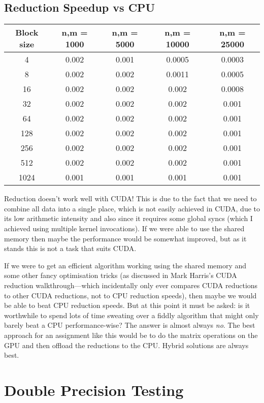 \documentclass[a4paper, fleqn]{article}
\begin{document}
\subsection{Reduction Speedup vs CPU}%
\begin{center}
 \begin{tabular}{||c | c | c | c | c ||}
 \hline
 Block size & n,m = 1000 & n,m = 5000 & n,m = 10000 & n,m = 25000 \\ [0.5ex] 
 \hline
 4 & 0.002 & 0.001 & 0.0005 & 0.0003 \\
 \hline
 8 & 0.002 & 0.002 & 0.0011 & 0.0005 \\
 \hline
 16 & 0.002 & 0.002 & 0.002 & 0.0008 \\
 \hline
 32 & 0.002 & 0.002 & 0.002 & 0.001 \\
 \hline
 64 & 0.002 & 0.002 & 0.002 & 0.001 \\
 \hline
 128 & 0.002 & 0.002 & 0.002 & 0.001 \\
 \hline
 256 & 0.002 & 0.002 & 0.002 & 0.001 \\
 \hline
 512 & 0.002 & 0.002 & 0.002 & 0.001 \\
 \hline
 1024 & 0.001 & 0.001 & 0.001 & 0.001 \\
 \hline
\end{tabular}
\end{center}
Reduction doesn't work well with CUDA! This is due to the fact that we need to combine all data into a single place, which is not easily achieved in CUDA, due to its low arithmetic intensity and also since it requires some global syncs (which I achieved using multiple kernel invocations). If we were able to use the shared memory then maybe the performance would be somewhat improved, but as it stands this is not a task that suits CUDA. 

If we were to get an efficient algorithm working using the shared memory and some other fancy optimisation tricks (as discussed in Mark Harris's CUDA reduction walkthrough---which incidentally only ever compares CUDA reductions to other CUDA reductions, not to CPU reduction speeds), then maybe we would be able to beat CPU reduction speeds. But at this point it must be asked: is it worthwhile to spend lots of time sweating over a fiddly algorithm that might only barely beat a CPU performance-wise? The answer is almost always \emph{no}. The best approach for an assignment like this would be to do the matrix operations on the GPU and then offload the reductions to the CPU. Hybrid solutions are always best.

\section{Double Precision Testing}%
\end{document}
